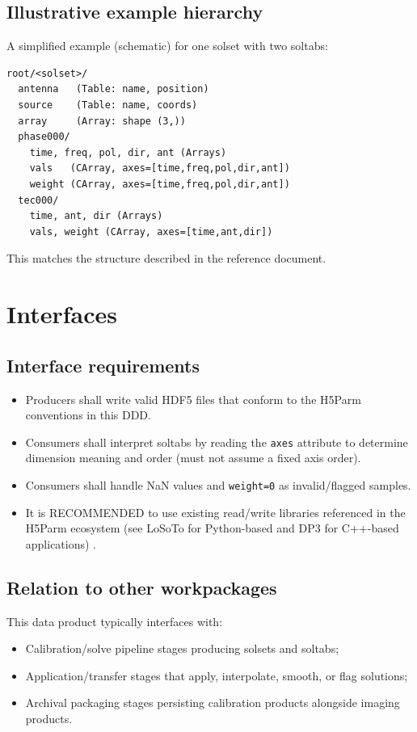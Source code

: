 \documentclass[a4paper,10pt,bibtotoc]{scrartcl}
\begin{document}
\subsection{Illustrative example hierarchy}
A simplified example (schematic) for one solset with two soltabs:
\begin{verbatim}
root/<solset>/
  antenna   (Table: name, position)
  source    (Table: name, coords)
  array     (Array: shape (3,))
  phase000/
    time, freq, pol, dir, ant (Arrays)
    vals   (CArray, axes=[time,freq,pol,dir,ant])
    weight (CArray, axes=[time,freq,pol,dir,ant])
  tec000/
    time, ant, dir (Arrays)
    vals, weight (CArray, axes=[time,ant,dir])
\end{verbatim}
This matches the structure described in the reference document. 


\section{Interfaces}
\label{sec:interfaces}

\subsection{Interface requirements}
\begin{itemize}
  \item Producers {shall} write valid HDF5 files that conform to the H5Parm conventions in this DDD.
  \item Consumers {shall} interpret soltabs by reading the \texttt{axes} attribute to determine dimension
        meaning and order (must not assume a fixed axis order). 
  \item Consumers {shall} handle NaN values and \texttt{weight=0} as invalid/flagged samples. 
  \item It is RECOMMENDED to use existing read/write libraries referenced in the H5Parm ecosystem (see LoSoTo for Python-based and DP3 for C++-based applications) . 
\end{itemize}

\subsection{Relation to other workpackages}
This data product typically interfaces with:
\begin{itemize}
  \item Calibration/solve pipeline stages producing solsets and soltabs;
  \item Application/transfer stages that apply, interpolate, smooth, or flag solutions;
  \item Archival packaging stages persisting calibration products alongside imaging products.
\end{itemize}
\end{document}
